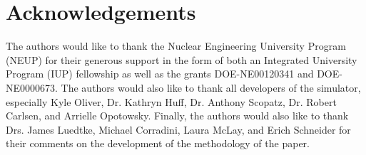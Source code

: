 \documentclass[review]{elsarticle}
\begin{document}
 






%

\section*{Acknowledgements}

The authors would like to thank the Nuclear Engineering University Program
(NEUP) for their generous support in the form of both an Integrated University
Program (IUP) fellowship as well as the grants DOE-NE00120341 and
DOE-NE0000673. The authors would also like to thank all developers of the
\Cyclus simulator, especially Kyle Oliver, Dr. Kathryn Huff, Dr. Anthony
Scopatz, Dr. Robert Carlsen, and Arrielle Opotowsky. Finally, the authors would
also like to thank Drs. James Luedtke, Michael Corradini, Laura McLay, and Erich
Schneider for their comments on the development of the methodology of the paper.

\newpage
\section*{\refname}

\end{document}
